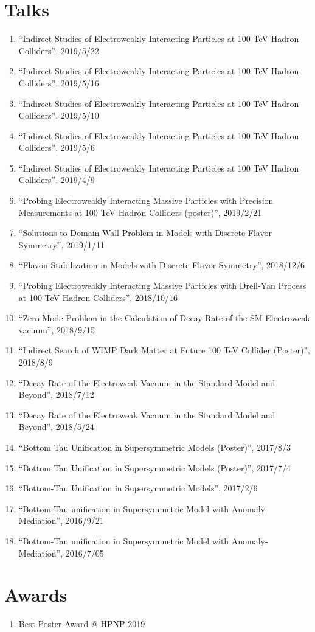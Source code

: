 \documentclass[12pt]{article}
\begin{document}
\vspace{-5mm}


\nocite{*}

\section*{Talks}

\begin{enumerate}
 \item ``Indirect Studies of Electroweakly Interacting Particles at 100 TeV Hadron Colliders'', 2019/5/22
 \item ``Indirect Studies of Electroweakly Interacting Particles at 100 TeV Hadron Colliders'', 2019/5/16
 \item ``Indirect Studies of Electroweakly Interacting Particles at 100 TeV Hadron Colliders'', 2019/5/10
 \item ``Indirect Studies of Electroweakly Interacting Particles at 100 TeV Hadron Colliders'', 2019/5/6
 \item ``Indirect Studies of Electroweakly Interacting Particles at 100 TeV Hadron Colliders'', 2019/4/9
 \item ``Probing Electroweakly Interacting Massive Particles with Precision Measurements at 100 TeV Hadron Colliders (poster)'', 2019/2/21
 \item ``Solutions to Domain Wall Problem in Models with Discrete Flavor Symmetry'', 2019/1/11
 \item ``Flavon Stabilization in Models with Discrete Flavor Symmetry'', 2018/12/6
 \item ``Probing Electroweakly Interacting Massive Particles with Drell-Yan Process at 100 TeV Hadron Colliders'', 2018/10/16
 \item ``Zero Mode Problem in the Calculation of Decay Rate of the SM Electroweak vacuum'', 2018/9/15
 \item ``Indirect Search of WIMP Dark Matter at Future 100 TeV Collider (Poster)'', 2018/8/9
 \item ``Decay Rate of the Electroweak Vacuum in the Standard Model and Beyond'', 2018/7/12
 \item ``Decay Rate of the Electroweak Vacuum in the Standard Model and Beyond'', 2018/5/24
 \item ``Bottom Tau Unification in Supersymmetric Models (Poster)'', 2017/8/3
 \item ``Bottom Tau Unification in Supersymmetric Models (Poster)'', 2017/7/4
 \item ``Bottom-Tau Unification in Supersymmetric Models'', 2017/2/6
 \item ``Bottom-Tau unification in Supersymmetric Model with Anomaly-Mediation'', 2016/9/21
 \item ``Bottom-Tau unification in Supersymmetric Model with Anomaly-Mediation'', 2016/7/05
\end{enumerate}

\section*{Awards}

\begin{enumerate}
 \item Best Poster Award @ HPNP 2019
\end{enumerate}
\end{document}
